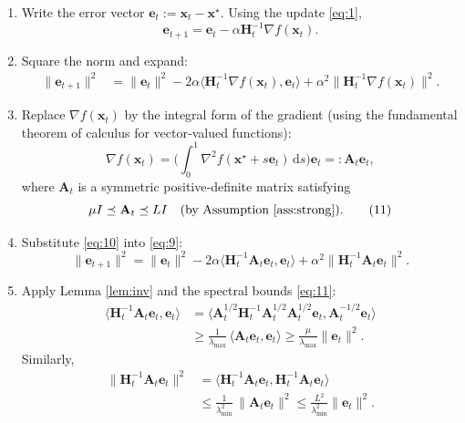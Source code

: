 \documentclass{article}
\newcommand{\ip}[2]{\langle #1,#2\rangle}
\newcommand{\grad}{\nabla}
\newcommand{\Hess}{\nabla^{2}}
\begin{document}
\begin{enumerate}
\item[Step 1.]  Write the error vector $\mathbf e_{t}:=\mathbf x_{t}-\mathbf x^{\star}$.  
Using the update \eqref{eq:1},
\[
\mathbf e_{t+1}= \mathbf e_{t}-\alpha\mathbf H_{t}^{-1}\grad f(\mathbf x_{t}).
\tag{8}
\]

\item[Step 2.]  Square the norm and expand:
\[
\begin{aligned}
\|\mathbf e_{t+1}\|^{2}
&= \|\mathbf e_{t}\|^{2}
-2\alpha\ip{\mathbf H_{t}^{-1}\grad f(\mathbf x_{t})}{\mathbf e_{t}}
+\alpha^{2}\|\mathbf H_{t}^{-1}\grad f(\mathbf x_{t})\|^{2}.
\end{aligned}
\tag{9}
\]

\item[Step 3.]  Replace $\grad f(\mathbf x_{t})$ by the integral form of the gradient
(using the fundamental theorem of calculus for vector‑valued functions):
\[
\grad f(\mathbf x_{t})
= \bigl(\int_{0}^{1}\Hess f(\mathbf x^{\star}+s\mathbf e_{t})\,\mathrm ds\bigr)\mathbf e_{t}
=: \mathbf A_{t}\mathbf e_{t},
\tag{10}
\]
where $\mathbf A_{t}$ is a symmetric positive‑definite matrix satisfying
\[
\mu I\preceq\mathbf A_{t}\preceq L I
\quad\text{(by Assumption \ref{ass:strong})}.
\tag{11}
\]

\item[Step 4.]  Substitute \eqref{eq:10} into \eqref{eq:9}:
\[
\|\mathbf e_{t+1}\|^{2}
= \|\mathbf e_{t}\|^{2}
-2\alpha\ip{\mathbf H_{t}^{-1}\mathbf A_{t}\mathbf e_{t}}{\mathbf e_{t}}
+\alpha^{2}\|\mathbf H_{t}^{-1}\mathbf A_{t}\mathbf e_{t}\|^{2}.
\tag{12}
\]

\item[Step 5.]  Apply Lemma \ref{lem:inv} and the spectral bounds \eqref{eq:11}:
\[
\begin{aligned}
\ip{\mathbf H_{t}^{-1}\mathbf A_{t}\mathbf e_{t}}{\mathbf e_{t}}
&= \ip{\mathbf A_{t}^{1/2}\mathbf H_{t}^{-1}\mathbf A_{t}^{1/2}\mathbf A_{t}^{1/2}\mathbf e_{t}}
      {\mathbf A_{t}^{-1/2}\mathbf e_{t}}  \\
&\ge \frac{1}{\lambda_{\max}}\,
      \ip{\mathbf A_{t}\mathbf e_{t}}{\mathbf e_{t}}
\ge \frac{\mu}{\lambda_{\max}}\|\mathbf e_{t}\|^{2}.
\end{aligned}
\tag{13}
\]
Similarly,
\[
\begin{aligned}
\|\mathbf H_{t}^{-1}\mathbf A_{t}\mathbf e_{t}\|^{2}
&= \ip{\mathbf H_{t}^{-1}\mathbf A_{t}\mathbf e_{t}}
        {\mathbf H_{t}^{-1}\mathbf A_{t}\mathbf e_{t}}   \\
&\le \frac{1}{\lambda_{\min}^{2}}\,
      \|\mathbf A_{t}\mathbf e_{t}\|^{2}
\le \frac{L^{2}}{\lambda_{\min}^{2}}\|\mathbf e_{t}\|^{2}.
\end{aligned}
\tag{14}
\]


\end{enumerate}
\end{document}
